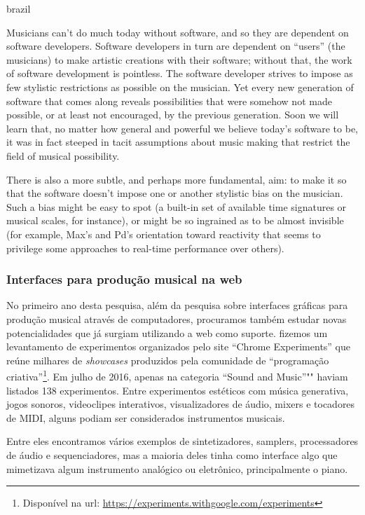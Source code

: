 \begin{otherlanguage*}{brazil}
\begin{citacao}
Musicians can’t do much today without software, and so they are dependent on software developers. Software developers in turn are dependent on “users” (the musicians) to make artistic creations with their software; without that, the work of software development is pointless. The software developer strives to impose as few stylistic restrictions as possible on the musician. Yet every new generation of software that comes along reveals possibilities that were somehow not made possible, or at least not encouraged, by the previous generation. Soon we will learn that, no matter how general and powerful we believe today’s software to be, it was in fact steeped in tacit assumptions about music making that restrict the field of musical possibility. \cite{PucketteMiller}
\end{citacao}

\begin{citacao}
There is also a more subtle, and perhaps more fundamental, aim: to make it so that the software doesn’t impose one or another stylistic bias on the musician. Such a bias might be easy to spot (a built-in set of available time signatures or musical scales, for instance), or might be so ingrained as to be almost invisible (for example, Max’s and Pd’s orientation toward reactivity that seems to privilege some approaches to real-time performance over others).
\end{citacao}

\subsubsection{Interfaces para produção musical na web}
No primeiro ano desta pesquisa, além da pesquisa sobre interfaces gráficas para produção musical através de computadores, procuramos também estudar novas potencialidades que já surgiam utilizando a web como suporte.  fizemos um levantamento de experimentos organizados pelo site ``Chrome Experiments'' que reúne milhares de \emph{showcases} produzidos pela comunidade de ``programação criativa''\footnote{Disponível na url: \url{https://experiments.withgoogle.com/experiments}}. Em julho de 2016, apenas na categoria ``Sound and Music''""  haviam listados 138 experimentos. Entre experimentos estéticos com música generativa, jogos sonoros, videoclipes interativos, visualizadores de áudio, mixers e tocadores de MIDI, alguns podiam ser considerados instrumentos musicais. 

Entre eles encontramos vários exemplos de sintetizadores, samplers, processadores de áudio e sequenciadores, mas a maioria deles tinha como interface algo que mimetizava algum instrumento analógico ou eletrônico, principalmente o piano.


\end{otherlanguage*}
